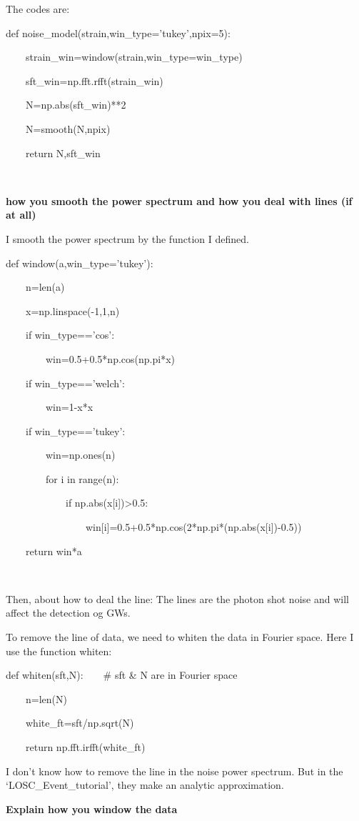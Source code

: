 \documentclass[showpacs, oneside, onecolumn, prl, amsmath, amssymb, nofootinbib, superscriptaddress, notitlepage]{revtex4-1}
\begin{document}
The codes are:

{\color{gray}

def noise\_model(strain,win\_type='tukey',npix=5):

~~~~strain\_win=window(strain,win\_type=win\_type)

~~~~sft\_win=np.fft.rfft(strain\_win)

~~~~N=np.abs(sft\_win)**2

~~~~N=smooth(N,npix)

~~~~return N,sft\_win

~~~~}

\textbf{how you smooth the power spectrum and how you deal with lines (if at all)}

I smooth the power spectrum by the function I defined.

{\color{gray}
def window(a,win\_type='tukey'):

~~~~n=len(a)

~~~~x=np.linspace(-1,1,n)

~~~~if win\_type=='cos':

~~~~~~~~win=0.5+0.5*np.cos(np.pi*x)

~~~~if win\_type=='welch':

~~~~~~~~win=1-x*x

~~~~if win\_type=='tukey':

~~~~~~~~win=np.ones(n)

~~~~~~~~for i in range(n):

~~~~~~~~~~~~if np.abs(x[i])>0.5:

~~~~~~~~~~~~~~~~win[i]=0.5+0.5*np.cos(2*np.pi*(np.abs(x[i])-0.5))

~~~~return win*a

~~~~}

Then, about how to deal the line: The lines are the photon shot noise and will affect the detection og GWs.

To remove the line of data, we need to whiten the data in Fourier space. Here I use the function whiten:

{\color{gray}
def whiten(sft,N):~~~~\# sft \& N are in Fourier space

~~~~n=len(N)

~~~~white\_ft=sft/np.sqrt(N)

~~~~return np.fft.irfft(white\_ft)
}

I don't know how to remove the line in the noise power spectrum. But in the `LOSC\_Event\_tutorial', they make an analytic approximation.

\textbf{Explain how you window the data}
\end{document}
